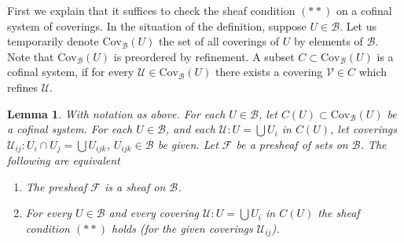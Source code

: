 \documentclass{stacks-project}
\theoremstyle{plain}
\newtheorem{lemma}[subsection]{Lemma}
\theoremstyle{definition}
\theoremstyle{remark}
\numberwithin{equation}{subsection}
\begin{document}
\noindent
First we explain that it suffices to
check the sheaf condition $(**)$
on a cofinal system of coverings.
In the situation of the definition, suppose
$U \in \mathcal{B}$. Let us temporarily denote
$\text{Cov}_\mathcal{B}(U)$ the set of all coverings
of $U$ by elements of $\mathcal{B}$.
Note that $\text{Cov}_\mathcal{B}(U)$ is preordered by refinement.
A subset $C \subset \text{Cov}_\mathcal{B}(U)$ is a
cofinal system, if for every $\mathcal{U} \in \text{Cov}_\mathcal{B}(U)$
there exists a covering $\mathcal{V} \in C$ which refines $\mathcal{U}$.

\begin{lemma}
\label{lemma-cofinal-systems-coverings}
With notation as above.
For each $U \in \mathcal{B}$, let $C(U) \subset \text{Cov}_\mathcal{B}(U)$
be a cofinal system. For each $U \in \mathcal{B}$, and each
$\mathcal{U} : U = \bigcup U_i$ in $C(U)$, let coverings
$\mathcal{U}_{ij} : U_i \cap U_j = \bigcup U_{ijk}$,
$U_{ijk} \in \mathcal{B}$ be given.
Let $\mathcal{F}$ be a presheaf of sets on $\mathcal{B}$.
The following are equivalent
\begin{enumerate}
\item The presheaf $\mathcal{F}$ is a sheaf on $\mathcal{B}$.
\item For every $U \in \mathcal{B}$ and every covering
$\mathcal{U} : U = \bigcup U_i$ in $C(U)$ the sheaf condition
$(**)$ holds (for the given coverings $\mathcal{U}_{ij}$).
\end{enumerate}
\end{lemma}
\end{document}
